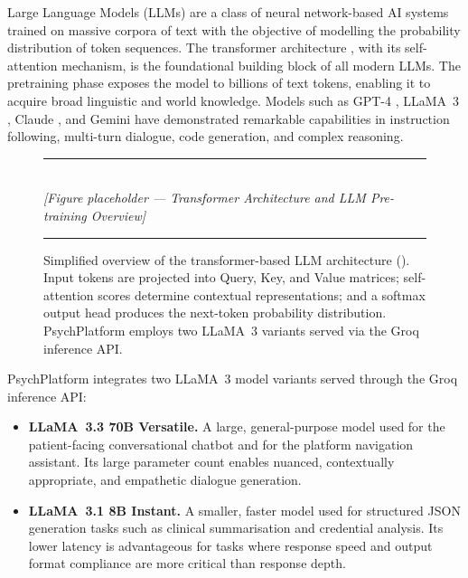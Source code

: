 Large Language Models (LLMs) are a class of neural network-based AI systems
trained on massive corpora of text with the objective of modelling the
probability distribution of token sequences. The transformer architecture
\cite{Vaswani2017}, with its self-attention mechanism, is the foundational
building block of all modern LLMs. The pretraining phase exposes the model to
billions of text tokens, enabling it to acquire broad linguistic and world
knowledge. Models such as GPT-4 \cite{OpenAI2023}, LLaMA~3 \cite{MetaAI2024},
Claude \cite{Anthropic2024}, and Gemini \cite{GoogleDeepMind2024} have
demonstrated remarkable capabilities in instruction following, multi-turn
dialogue, code generation, and complex reasoning.

\begin{figure}[H]
  \centering
  \rule{0.85\textwidth}{0.4pt}\\[6pt]
  {\small\itshape [Figure placeholder — Transformer Architecture and LLM Pre-training Overview]}
  \rule{0.85\textwidth}{0.4pt}
  \caption{Simplified overview of the transformer-based LLM architecture
           (\citealt{Vaswani2017}). Input tokens are projected into Query, Key,
           and Value matrices; self-attention scores determine contextual
           representations; and a softmax output head produces the next-token
           probability distribution. PsychPlatform employs two LLaMA~3 variants
           served via the Groq inference API.}
  \label{fig:transformer}
\end{figure}

PsychPlatform integrates two LLaMA~3 model variants served through the Groq
inference API:

\begin{itemize}[leftmargin=1.5em, itemsep=6pt]

  \item \textbf{LLaMA~3.3 70B Versatile.} A large, general-purpose model used
        for the patient-facing conversational chatbot and for the platform
        navigation assistant. Its large parameter count enables nuanced,
        contextually appropriate, and empathetic dialogue generation.

  \item \textbf{LLaMA~3.1 8B Instant.} A smaller, faster model used for
        structured JSON generation tasks such as clinical summarisation and
        credential analysis. Its lower latency is advantageous for tasks where
        response speed and output format compliance are more critical than
        response depth.

\end{itemize}

